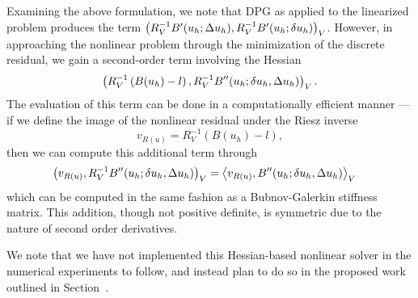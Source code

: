 Examining the above formulation, we note that DPG as applied to the linearized problem produces the term $ \LRp{R_V^{-1}B'(u_h;\Delta u_h), R_V^{-1}B'(u_h;\delta u_h)}_V$. However, in approaching the nonlinear problem through the minimization of the discrete residual, we gain a second-order term involving the Hessian
\[
\LRp{R_V^{-1}\left(B(u_h)-l\right),R_V^{-1}B''(u_h;\delta u_h,\Delta u_h)}_V.
\] 
The evaluation of this term can be done in a computationally efficient manner --- if we define the image of the nonlinear residual under the Riesz inverse
\[
v_{R(u)} = R_V^{-1}\left(B(u_h)-l\right),
\]
then we can compute this additional term through
\begin{align*}
\LRp{v_{R(u)},R_V^{-1}B''(u_h;\delta u_h,\Delta u_h)}_V &= \LRa{v_{R(u)},B''(u_h;\delta u_h,\Delta u_h)}_V
\end{align*}
which can be computed in the same fashion as a Bubnov-Galerkin stiffness matrix. This addition, though not positive definite, is symmetric due to the nature of second order derivatives. 

We note that we have not implemented this Hessian-based nonlinear solver in the numerical experiments to follow, and instead plan to do so in the proposed work outlined in Section~.

